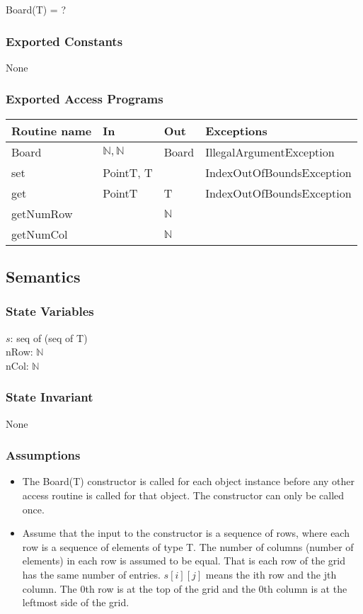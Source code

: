 \documentclass[12pt]{article}
\begin{document}
Board(T) = ?

\subsubsection* {Exported Constants}

None

\subsubsection* {Exported Access Programs}

\begin{tabular}{| l | l | l | p{6cm} |}
\hline
\textbf{Routine name} & \textbf{In} & \textbf{Out} & \textbf{Exceptions}\\
\hline
Board & $\mathbb{N},\mathbb{N}$ & Board & IllegalArgumentException\\
\hline
set & PointT, T & ~ & IndexOutOfBoundsException\\
\hline
get & PointT & T & IndexOutOfBoundsException\\
\hline
getNumRow & ~ & $\mathbb{N}$ & \\
\hline
getNumCol & ~ & $\mathbb{N}$ & \\
\hline
\end{tabular}

\subsection* {Semantics}

\subsubsection* {State Variables}

$s$: seq of (seq of T)\\
nRow: $\mathbb{N}$\\
nCol: $\mathbb{N}$

\subsubsection* {State Invariant}

None

\subsubsection* {Assumptions}

\begin{itemize}
\item The Board(T) constructor is called for each object instance before any
other access routine is called for that object.  The constructor can only be
called once.
\item Assume that the input to the constructor is a sequence of rows, where each
  row is a sequence of elements of type T.  The number of columns (number of
  elements) in each row is assumed to be equal. That is each row
  of the grid has the same number of entries.  $s[i][j]$ means the ith row and
  the jth column.  The 0th row is at the top of the grid and the 0th column
  is at the leftmost side of the grid.
\end{itemize}
\end{document}
